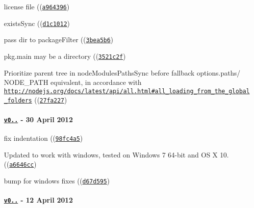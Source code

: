 \begin{DoxyItemize}
\item license file ((\href{https://github.com/browserify/resolve/commit/a9643965438eb4fcb068a5876b317f516199879a}{\tt {\ttfamily a964396}})
\item exists\+Sync ((\href{https://github.com/browserify/resolve/commit/d1c1012f14c50212ea49a9a1255c902f5ad6cb37}{\tt {\ttfamily d1c1012}})
\item pass dir to package\+Filter ((\href{https://github.com/browserify/resolve/commit/3bea5b6475b39e7f4974d29c6fa1e8eb8b1589af}{\tt {\ttfamily 3bea5b6}})
\item pkg.\+main may be a directory ((\href{https://github.com/browserify/resolve/commit/3521c2f2b93234e5a50dc47598554a76589d6d8c}{\tt {\ttfamily 3521c2f}})
\item Prioritize parent tree in node\+Modules\+Paths\+Sync before fallback options.\+paths/ N\+O\+D\+E\+\_\+\+P\+A\+TH equivalent, in accordance with \href{http://nodejs.org/docs/latest/api/all.html#all_loading_from_the_global_folders}{\tt http\+://nodejs.\+org/docs/latest/api/all.\+html\#all\+\_\+loading\+\_\+from\+\_\+the\+\_\+global\+\_\+folders} ((\href{https://github.com/browserify/resolve/commit/27fa22707e87738ddde61cb4ad90508cfe0d7755}{\tt {\ttfamily 27fa227}})
\end{DoxyItemize}

\paragraph*{\href{https://github.com/browserify/resolve/compare/v0.2.1...v0.2.2}{\tt v0..} -\/ 30 April 2012}


\begin{DoxyItemize}
\item fix indentation ((\href{https://github.com/browserify/resolve/commit/98fc4a50b68456d497a862b9c4e4e0a79570c770}{\tt {\ttfamily 98fc4a5}})
\item Updated to work with windows, tested on Windows 7 64-\/bit and OS X 10. ((\href{https://github.com/browserify/resolve/commit/a6646ccceb1a6c411d5b9dfdc97106c80d8a0a09}{\tt {\ttfamily a6646cc}})
\item bump for windows fixes ((\href{https://github.com/browserify/resolve/commit/d67d5959e1be31eb67d5b62e7050bff318572373}{\tt {\ttfamily d67d595}})
\end{DoxyItemize}

\paragraph*{\href{https://github.com/browserify/resolve/compare/v0.2.0...v0.2.1}{\tt v0..} -\/ 12 April 2012}


